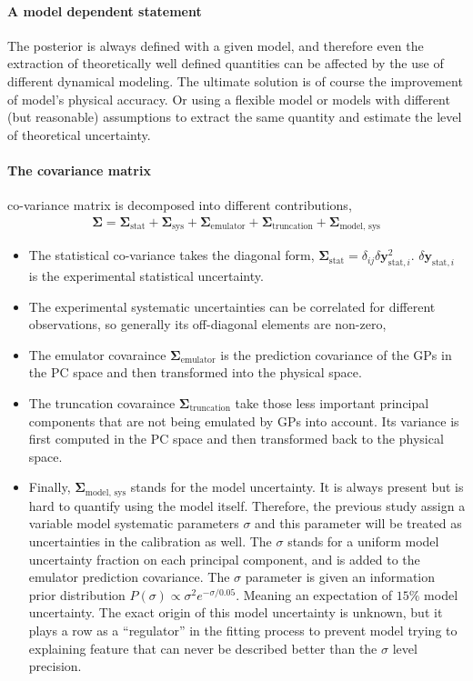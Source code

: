 \paragraph{A model dependent statement} The posterior is always defined with a given model, and therefore even the extraction of theoretically well defined quantities can be affected by the use of different dynamical modeling.
The ultimate solution is of course the improvement of model's physical accuracy.
Or using a flexible model or models with different (but reasonable) assumptions to extract the same quantity and estimate the level of theoretical uncertainty.

\paragraph{The covariance matrix} co-variance matrix is decomposed into different contributions,
\begin{eqnarray}
\mathbf{\Sigma} = \mathbf{\Sigma}_{\textrm{stat}} + \mathbf{\Sigma}_{\textrm{sys}} + \mathbf{\Sigma}_{\textrm{emulator}} + \mathbf{\Sigma}_{\textrm{truncation}} + \mathbf{\Sigma}_{\textrm{model, sys}}
\end{eqnarray}
\begin{itemize}
\item The statistical co-variance takes the diagonal form, $\mathbf{\Sigma}_{\textrm{stat}} = \delta_{ij}\delta\mathbf{y}_{\textrm{stat}, i}^2$. 
$\delta\mathbf{y}_{\textrm{stat}, i}$ is the experimental statistical uncertainty.
\item The experimental systematic uncertainties can be correlated for different observations, so generally its off-diagonal elements are non-zero,
\item The emulator covaraince $\mathbf{\Sigma}_{\textrm{emulator}}$ is the prediction covariance of the GPs in the PC space and then transformed into the physical space.
\item The truncation covaraince $\mathbf{\Sigma}_{\textrm{truncation}}$ take those less important principal components that are not being emulated by GPs into account. 
Its variance is first computed in the PC space and then transformed back to the physical space.
\item Finally, $\mathbf{\Sigma}_{\textrm{model, sys}}$ stands for the model uncertainty. 
It is always present but is hard to quantify using the model itself.
Therefore, the previous study \cite{Bernhard:2018hnz} assign a variable model systematic parameters $\sigma$ and this parameter will be treated as uncertainties in the calibration as well.
The $\sigma$ stands for a uniform model uncertainty fraction on each principal component, and is added to the emulator prediction covariance.
The $\sigma$ parameter is given an information prior distribution $P(\sigma) \propto \sigma^2 e^{-\sigma/0.05}$. Meaning an expectation of $15\%$ model uncertainty.
The exact origin of this model uncertainty is unknown, but it plays a row as a ``regulator'' in the fitting process to prevent model trying to explaining feature that can never be described better than the $\sigma$ level precision.
\end{itemize}

